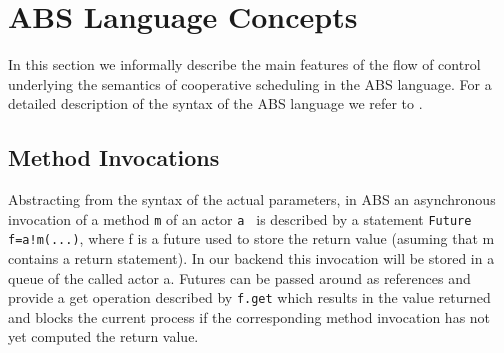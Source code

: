 

\section{ABS Language Concepts}
\label{lang}
In this section we informally describe the main features of the flow of control
underlying the semantics of cooperative scheduling in the ABS language.
For a detailed description of the syntax of the ABS language we refer to \cite{abs}.

\subsection{Method Invocations}\label{amc}
Abstracting from the syntax of the actual parameters,
in ABS an asynchronous invocation of a method \lstinline|m| of an actor \lstinline|a | is described by a statement
\lstinline|Future f=a!m(...)|, where f is a future used to store the return value
(asuming that m contains a return statement).
In our backend this invocation will be stored in a queue of the called actor a.
Futures can be passed around as references and provide a get operation
described by \lstinline|f.get| which results in the value returned and blocks
the current process if the corresponding method invocation has not yet computed
the return value.

